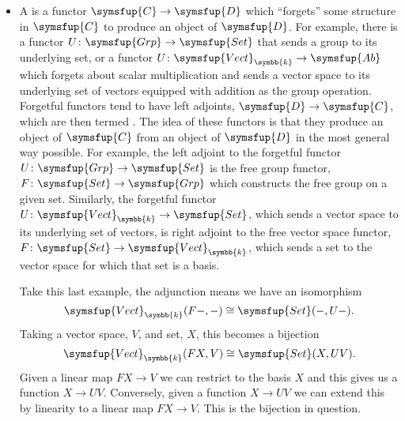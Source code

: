 \documentclass[fleqn]{NotesClass}
\makeatletter
\newcommand{\cat}[1]{\symsfup{#1}}
\newcommand{\c@egory}[1]{\symsfup{#1}}
\newcommand{\Set}{\c@egory{Set}}
\newcommand{\Grp}{\c@egory{Grp}}
\newcommand{\Ab}{\c@egory{Ab}}
\newcommand{\Vect}[1][\field]{\c@egory{Vect}_{#1}}
\newcommand{\isomorphic}{\cong}
\renewcommand{\field}{\symbb{k}}
\makeatother
\begin{document}
    \begin{exm}{}{}
        \begin{itemize}
            \item A  is a functor \(\cat{C} \to \cat{D}\) which \enquote{forgets} some structure in \(\cat{C}\) to produce an object of \(\cat{D}\).
            For example, there is a functor \(U \colon \Grp \to \Set\) that sends a group to its underlying set, or a functor \(U \colon \Vect \to \Ab\) which forgets about scalar multiplication and sends a vector space to its underlying set of vectors equipped with addition as the group operation.
            Forgetful functors tend to have left adjoints, \(\cat{D} \to \cat{C}\), which are then termed .
            The idea of these functors is that they produce an object of \(\cat{C}\) from an object of \(\cat{D}\) in the most general way possible.
            For example, the left adjoint to the forgetful functor \(U \colon \Grp \to \Set\) is the free group functor, \(F \colon \Set \to \Grp\) which constructs the free group on a given set.
            Similarly, the forgetful functor \(U \colon \Vect \to \Set\), which sends a vector space to its underlying set of vectors, is right adjoint to the free vector space functor, \(F \colon \Set \to \Vect\), which sends a set to the vector space for which that set is a basis.
            
            Take this last example, the adjunction means we have an isomorphism
            \begin{equation}
                \Vect(F-, -) \isomorphic \Set(-, U-).
            \end{equation}
            Taking a vector space, \(V\), and set, \(X\), this becomes a bijection
            \begin{equation}
                \Vect(FX, V) \isomorphic \Set(X, UV).
            \end{equation}
            Given a linear map \(FX \to V\) we can restrict to the basis \(X\) and this gives us a function \(X \to UV\).
            Conversely, given a function \(X \to UV\) we can extend this by linearity to a linear map \(FX \to V\).
            This is the bijection in question.
            

\end{itemize}
\end{exm}
\end{document}
